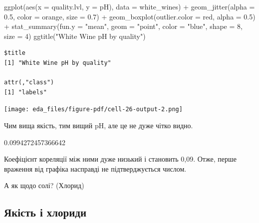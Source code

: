 \documentclass[
  letterpaper,
  DIV=11,
  numbers=noendperiod]{scrreprt}
\newenvironment{Shaded}{\begin{snugshade}}{\end{snugshade}}
\newcommand{\AttributeTok}[1]{\textcolor[rgb]{0.40,0.45,0.13}{#1}}
\newcommand{\DecValTok}[1]{\textcolor[rgb]{0.68,0.00,0.00}{#1}}
\newcommand{\FloatTok}[1]{\textcolor[rgb]{0.68,0.00,0.00}{#1}}
\newcommand{\FunctionTok}[1]{\textcolor[rgb]{0.28,0.35,0.67}{#1}}
\newcommand{\NormalTok}[1]{\textcolor[rgb]{0.00,0.23,0.31}{#1}}
\newcommand{\SpecialCharTok}[1]{\textcolor[rgb]{0.37,0.37,0.37}{#1}}
\newcommand{\StringTok}[1]{\textcolor[rgb]{0.13,0.47,0.30}{#1}}
\begin{document}
\begin{Shaded}
\begin{Highlighting}[]
\FunctionTok{ggplot}\NormalTok{(}\FunctionTok{aes}\NormalTok{(}\AttributeTok{x =}\NormalTok{ quality.lvl, }\AttributeTok{y =}\NormalTok{ pH), }\AttributeTok{data =}\NormalTok{ white\_wines) }\SpecialCharTok{+}
  \FunctionTok{geom\_jitter}\NormalTok{(}\AttributeTok{alpha =} \FloatTok{0.5}\NormalTok{, }\AttributeTok{color =} \StringTok{\textquotesingle{}orange\textquotesingle{}}\NormalTok{, }\AttributeTok{size =} \FloatTok{0.7}\NormalTok{) }\SpecialCharTok{+}
  \FunctionTok{geom\_boxplot}\NormalTok{(}\AttributeTok{outlier.color =} \StringTok{\textquotesingle{}red\textquotesingle{}}\NormalTok{, }\AttributeTok{alpha =} \FloatTok{0.5}\NormalTok{) }\SpecialCharTok{+}
  \FunctionTok{stat\_summary}\NormalTok{(}\AttributeTok{fun.y =} \StringTok{"mean"}\NormalTok{, }\AttributeTok{geom =} \StringTok{"point"}\NormalTok{, }\AttributeTok{color =} \StringTok{"blue"}\NormalTok{, }\AttributeTok{shape =} \DecValTok{8}\NormalTok{, }\AttributeTok{size =} \DecValTok{4}\NormalTok{)}
  \FunctionTok{ggtitle}\NormalTok{(}\StringTok{"White Wine pH by quality"}\NormalTok{)}
\end{Highlighting}
\end{Shaded}

\begin{verbatim}
$title
[1] "White Wine pH by quality"

attr(,"class")
[1] "labels"
\end{verbatim}

\texttt{[image: eda\_files/figure-pdf/cell-26-output-2.png]}

Чим вища якість, тим вищий pH, але це не дуже чітко видно.

\begin{Shaded}
\end{Shaded}

0.0994272457366642

Коефіцієнт кореляції між ними дуже низький і становить 0,09. Отже, перше
враження від графіка насправді не підтверджується числом.

А як щодо солі? (Хлорид)

\subsection{Якість і
хлориди}\label{ux44fux43aux456ux441ux442ux44c-ux456-ux445ux43bux43eux440ux438ux434ux438}
\end{document}
